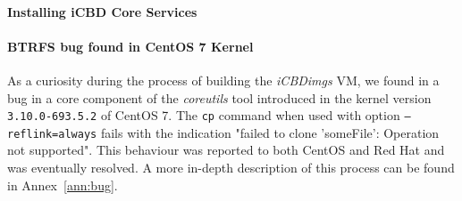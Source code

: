 \paragraph{Installing iCBD Core Services}
\label{par:impl_install_icbd_core}

\paragraph{BTRFS bug found in CentOS 7 Kernel}
\label{par:impl_centos_bug}

As a curiosity during the process of building the \textit{iCBDimgs} VM, we found in a bug in a core component of the \textit{coreutils} tool introduced in the kernel version \texttt{3.10.0-693.5.2} of CentOS 7. The \texttt{cp} command when used with option \texttt{--reflink=always} fails with the indication "failed to clone 'someFile': Operation not supported". This behaviour was reported to both CentOS and Red Hat and was eventually resolved. A more in-depth description of this process can be found in Annex~\ref{ann:bug}.







